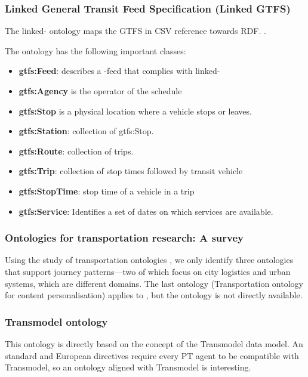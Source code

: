 \subsubsection{Linked General Transit Feed Specification (Linked GTFS)}
The linked- ontology maps the GTFS in CSV reference towards RDF. \cite{noauthor_opentransportlinked-gtfs_2023}\cite{noauthor_linked-gtfsspecmd_nodate}. 

The ontology has the following important classes:
\begin{itemize}
    \item \textbf{gtfs:Feed}: describes a -feed that complies with linked-
    \item \textbf{gtfs:Agency} is the operator of the schedule
    \item \textbf{gtfs:Stop} is a physical location where a vehicle stops or leaves.
    \item \textbf{gtfs:Station}: collection of gtfs:Stop.
    \item \textbf{gtfs:Route}: collection of trips.
    \item \textbf{gtfs:Trip}: collection of stop times followed by transit vehicle
    \item \textbf{gtfs:StopTime}: stop time of a vehicle in a trip
    \item \textbf{gtfs:Service}: Identifies a set of dates on which services are available.
\end{itemize}
\subsubsection{Ontologies for transportation research: A survey}
Using the study of transportation ontologies \cite{katsumi_ontologies_2018}, we only identify three ontologies that support journey patterns—two of which focus on city logistics and urban systems, which are different domains. The last ontology (Transportation ontology for content personalisation) applies to , but the ontology is not directly available.

\subsubsection{Transmodel ontology}
This ontology is directly based on the concept of the Transmodel data model. An  standard and European directives require every PT agent to be compatible with Transmodel, so an ontology aligned with Transmodel is interesting.

